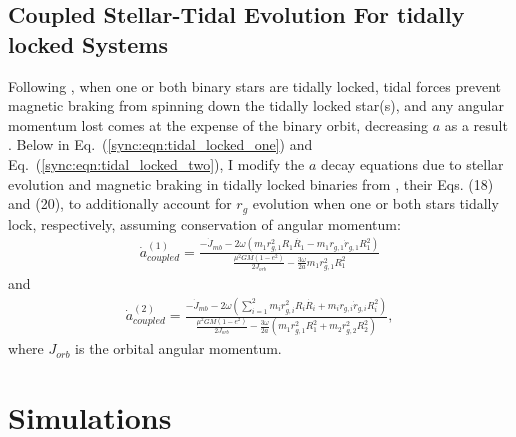 \subsection{Coupled Stellar-Tidal Evolution For tidally locked Systems} \label{sync:sec:coupled}

Following \citet{Fleming2018}, when one or both binary stars are tidally locked, tidal forces prevent magnetic braking from spinning down the tidally locked star(s), and any angular momentum lost comes at the expense of the binary orbit, decreasing $a$ as a result \citep{Verbunt1981}.  Below in Eq.~(\ref{sync:eqn:tidal_locked_one}) and Eq.~(\ref{sync:eqn:tidal_locked_two}), I modify the $a$ decay equations due to stellar evolution and magnetic braking in tidally locked binaries from \citet{Fleming2018}, their Eqs. (18) and (20), to additionally account for $r_g$ evolution when one or both stars tidally lock, respectively, assuming conservation of angular momentum:
\small
\begin{equation} \label{sync:eqn:tidal_locked_one}
\begin{split}
\dot{a}_{coupled}^{(1)} = \frac{-\dot{J}_{mb} - 2 \omega \left( m_1 r_{g,1}^2 R_1 \dot{R_1} - m_1 r_{g,1} \dot{r}_{g,1} R_1^2 \right)}
{\frac{\mu^2 G M (1-e^2)}{2J_{orb}} - \frac{3 \omega}{2a} m_1 r_{g,1}^2 R_1^2}
\end{split}
\end{equation}
\normalsize
and
\small
\begin{equation} \label{sync:eqn:tidal_locked_two}
\begin{split}
\dot{a}_{coupled}^{(2)} = \frac{-\dot{J}_{mb} - 2 \omega \left( \sum_{i=1}^{2} m_i r_{g,i}^2 R_i \dot{R_i} + m_i r_{g,i} \dot{r}_{g,i} R_i^2 \right)}
{\frac{\mu^2 G M (1-e^2)}{2J_{orb}} - \frac{3 \omega}{2a} \left( m_1 r_{g,1}^2 R_1^2 + m_2 r_{g,2}^2 R_2^2 \right)},
\end{split}
\end{equation}
\normalsize
where $J_{orb}$ is the orbital angular momentum.

\section{Simulations} \label{sync:sec:simulations}

